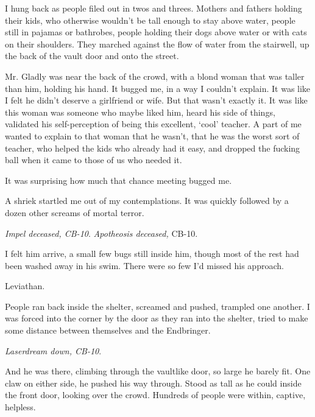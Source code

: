 I hung back as people filed out in twos and threes.  Mothers and fathers holding their kids, who otherwise wouldn't be tall enough to stay above water, people still in pajamas or bathrobes, people holding their dogs above water or with cats on their shoulders.  They marched against the flow of water from the stairwell, up the back of the vault door and onto the street.



Mr. Gladly was near the back of the crowd, with a blond woman that was taller than him, holding his hand.  It bugged me, in a way I couldn't explain.  It was like I felt he didn't deserve a girlfriend or wife.  But that wasn't exactly it.  It was like this woman was someone who maybe liked him, heard his side of things, validated his self-perception of being this excellent, `cool' teacher.  A part of me wanted to explain to that woman that he wasn't, that he was the worst sort of teacher, who helped the kids who already had it easy, and dropped the fucking ball when it came to those of us who needed it.



It was surprising how much that chance meeting bugged me.



A shriek startled me out of my contemplations.  It was quickly followed by a dozen other screams of mortal terror.



\emph{Impel deceased, CB-10}.  \emph{Apotheosis deceased,} CB-10.



\emph{ }I felt him arrive, a small few bugs still inside him, though most of the rest had been washed away in his swim.  There were so few I'd missed his approach.



Leviathan.



People ran back inside the shelter, screamed and pushed, trampled one another.  I was forced into the corner by the door as they ran into the shelter, tried to make some distance between themselves and the Endbringer.



\emph{Laserdream down, CB-10}.



And he was there, climbing through the vaultlike door, so large he barely fit.  One claw on either side, he pushed his way through.  Stood as tall as he could inside the front door, looking over the crowd.  Hundreds of people were within, captive, helpless.



